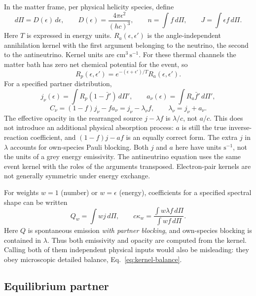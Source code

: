 \documentclass[11pt,a4paper]{article}
\begin{document}
In the matter frame, per physical helicity species, define
\[
 d\Pi=D(\epsilon)\,d\epsilon,\qquad
 D(\epsilon)=\frac{4\pi\epsilon^2}{(hc)^3},\qquad
 n=\int f\,d\Pi,\qquad J=\int\epsilon f\,d\Pi.
\]
Here $T$ is expressed in energy units. $R_a(\epsilon,\epsilon')$ is the
angle-independent annihilation kernel with the first argument belonging to
the neutrino, the second to the antineutrino. Kernel units are
$\mathrm{cm^3\,s^{-1}}$. For these thermal channels the matter bath has zero
net chemical potential for the event, so
\begin{equation}\label{eq:kernel-balance}
 R_p(\epsilon,\epsilon')
 =e^{-(\epsilon+\epsilon')/T}R_a(\epsilon,\epsilon').
\end{equation}
For a specified partner distribution,
\begin{equation}\label{eq:ja}
 j_\nu(\epsilon)=\int R_p(1-\bar f')\,d\Pi',\qquad
 a_\nu(\epsilon)=\int R_a\bar f'\,d\Pi',
\end{equation}
\begin{equation}\label{eq:collision}
 C_\nu=(1-f)j_\nu-fa_\nu
       =j_\nu-\lambda_\nu f,\qquad \lambda_\nu=j_\nu+a_\nu.
\end{equation}
The effective opacity in the rearranged source $j-\lambda f$ is
$\lambda/c$, not $a/c$. This does not introduce an additional physical
absorption process: $a$ is still the true inverse-reaction coefficient, and
$(1-f)j-af$ is an equally correct form. The extra $j$ in $\lambda$ accounts
for own-species Pauli blocking. Both $j$ and $a$ here have units
$\mathrm{s^{-1}}$, not the units of a grey energy emissivity.
The antineutrino equation uses the same event kernel with the roles of the
arguments transposed. Electron-pair kernels are not generally symmetric under
energy exchange.

For weights $w=1$ (number) or $w=\epsilon$ (energy), coefficients for a
specified spectral shape can be written
\begin{equation}\label{eq:grey}
 Q_w=\int wj\,d\Pi,\qquad
 c\kappa_w=\frac{\int w\lambda f\,d\Pi}{\int wf\,d\Pi}.
\end{equation}
Here $Q$ is spontaneous emission \emph{with partner blocking}, and
own-species blocking is contained in $\lambda$. Thus both emissivity and
opacity are computed from the kernel. Calling both of them independent
physical inputs would also be misleading: they obey microscopic detailed
balance, Eq.~\eqref{eq:kernel-balance}.

\subsection{Equilibrium partner}
\end{document}
